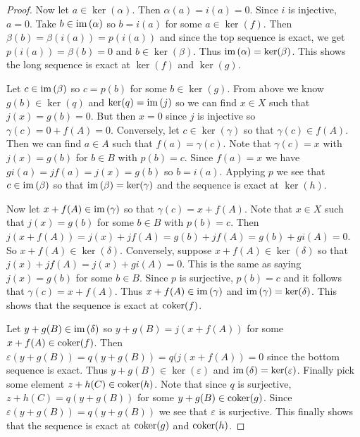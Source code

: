 \documentclass{article}
\newcommand{\coker}{\textup{coker}}
\newcommand{\im}{\textup{im}\,}
\begin{document}
\begin{proof}
Now let $a \in \ker(\alpha)$. Then $\alpha(a) = i(a) = 0$. Since $i$ is injective, $a = 0$. Take $b \in \im(\alpha)$ so $b = i(a)$ for some $a \in \ker(f)$. Then $\beta(b) = \beta(i(a)) = p(i(a))$ and since the top sequence is exact, we get $p(i(a)) = \beta(b) = 0$ and $b \in \ker(\beta)$. Thus $\im(\alpha) = \ker(\beta)$. This shows the long sequence is exact at $\ker(f)$ and $\ker(g)$.

Let $c \in \im(\beta)$ so $c = p(b)$ for some $b \in \ker(g)$. From above we know $g(b) \in \ker(q)$ and $\ker(q) = \im(j)$ so we can find $x \in X$ such that $j(x) = g(b) = 0$. But then $x = 0$ since $j$ is injective so $\gamma(c) = 0 + f(A) = 0$. Conversely, let $c \in \ker(\gamma)$ so that $\gamma(c) \in f(A)$. Then we can find $a \in A$ such that $f(a) = \gamma(c)$. Note that $\gamma(c) = x$ with $j(x) = g(b)$ for $b \in B$ with $p(b) = c$. Since $f(a) = x$ we have $gi(a) = jf(a) = j(x) = g(b)$ so $b = i(a)$. Applying $p$ we see that $c \in \im(\beta)$ so that $\im(\beta) = \ker(\gamma)$ and the sequence is exact at $\ker(h)$.

Now let $x + f(A) \in \im(\gamma)$ so that $\gamma(c) = x + f(A)$. Note that $x \in X$ such that $j(x) = g(b)$ for some $b \in B$ with $p(b) = c$. Then $j(x + f(A)) = j(x) + jf(A) = g(b) + jf(A) = g(b) + gi(A) = 0$. So $x + f(A) \in \ker(\delta)$. Conversely, suppose $x + f(A) \in \ker(\delta)$ so that $j(x) + jf(A) = j(x) + gi(A) = 0$. This is the same as saying $j(x) = g(b)$ for some $b \in B$. Since $p$ is surjective, $p(b) = c$ and it follows that $\gamma(c) = x + f(A)$. Thus $x + f(A) \in \im(\gamma)$ and $\im(\gamma) = \ker(\delta)$. This shows that the sequence is exact at $\coker(f)$.

Let $y + g(B) \in \im(\delta)$ so $y + g(B) = j(x + f(A))$ for some $x + f(A) \in \coker(f)$. Then $\varepsilon(y + g(B)) = q(y + g(B)) = q(j(x + f(A)) = 0$ since the bottom sequence is exact. Thus $y + g(B) \in \ker(\varepsilon)$ and $\im(\delta) = \ker(\varepsilon)$. Finally pick some element $z + h(C) \in \coker(h)$. Note that since $q$ is surjective, $z + h(C) = q(y + g(B))$ for some $y + g(B) \in \coker(g)$. Since $\varepsilon(y + g(B)) = q(y + g(B))$ we see that $\varepsilon$ is surjective. This finally shows that the sequence is exact at $\coker(g)$ and $\coker(h)$.
\end{proof}
\end{document}
